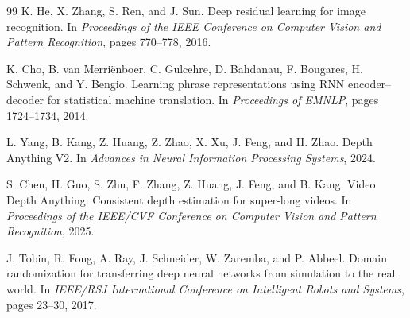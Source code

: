 \documentclass[10pt,twocolumn,letterpaper]{article}
\begin{document}
{\begin{thebibliography}{99}
K. He, X. Zhang, S. Ren, and J. Sun.
Deep residual learning for image recognition.
In \emph{Proceedings of the IEEE Conference on Computer Vision and Pattern Recognition}, pages 770--778, 2016.

K. Cho, B. van Merri\"enboer, C. Gulcehre, D. Bahdanau, F. Bougares, H. Schwenk, and Y. Bengio.
Learning phrase representations using {RNN} encoder--decoder for statistical machine translation.
In \emph{Proceedings of EMNLP}, pages 1724--1734, 2014.

L. Yang, B. Kang, Z. Huang, Z. Zhao, X. Xu, J. Feng, and H. Zhao.
Depth Anything {V2}.
In \emph{Advances in Neural Information Processing Systems}, 2024.

S. Chen, H. Guo, S. Zhu, F. Zhang, Z. Huang, J. Feng, and B. Kang.
Video Depth Anything: Consistent depth estimation for super-long videos.
In \emph{Proceedings of the IEEE/CVF Conference on Computer Vision and Pattern Recognition}, 2025.

J. Tobin, R. Fong, A. Ray, J. Schneider, W. Zaremba, and P. Abbeel.
Domain randomization for transferring deep neural networks from simulation to the real world.
In \emph{IEEE/RSJ International Conference on Intelligent Robots and Systems}, pages 23--30, 2017.

\end{thebibliography}
}
\end{document}
